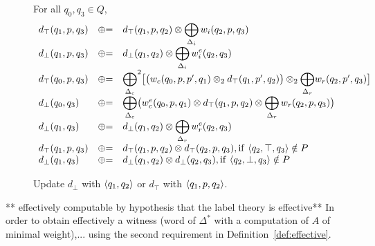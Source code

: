 \begin{figure}[ht]
For all $q_0, q_3 \in Q$, %
\[
\begin{array}{lcl}
d_\top(q_1, p, q_3) & \opluseq &
  d_\top(q_1, p, q_2) \otimes
  \displaystyle\bigoplus_{\Deltai} \weii(q_2, p, q_3)\\
%
d_\bot(q_1, p, q_3) & \opluseq &
  d_\bot(q_1, q_2) \otimes
  \displaystyle\bigoplus_{\Deltai} \weiei(q_2, q_3)\\
%
d_\top(q_0, p, q_3) & \opluseq &
  {\displaystyle\bigoplus_{\Deltac}}^2
  \bigl[ \bigl( \weic(q_0, p, p', q_1) \otimes_2
  d_\top(q_1, p', q_2) \bigr) \otimes_2
  {\displaystyle\bigoplus_{\Deltar}} \weir(q_2, p', q_3) \bigr]\\
%
d_\bot(q_0, q_3) & \opluseq &
  {\displaystyle\bigoplus_{\Deltac}}
  \bigl(
  \weiec(q_0, p, q_1) \otimes
   d_\top(q_1, p, q_2) \otimes
  \displaystyle\bigoplus_{\Deltar} \weir(q_2, p, q_3)\bigr)\\
%
d_\bot(q_1, q_3) & \opluseq &
  d_\bot(q_1, q_2) \otimes
  \displaystyle\bigoplus_{\Deltar} \weier(q_2, q_3)\\
%
d_\top(q_1, p, q_3) & \opluseq &
  d_\top(q_1, p, q_2) \otimes d_\top(q_2, p, q_3),
  \mathrm{if~} \< q_2, \top, q_3> \notin P \\
%
d_\bot(q_1, q_3) & \opluseq &
  d_\bot(q_1, q_2) \otimes d_\bot(q_2, q_3), \mathrm{if~} \< q_2, \bot, q_3> \notin P \\
\end{array}
\]
%
\caption{Update $d_\bot$ with $\<q_1, q_2>$ or $d_\top$ with $\< q_1, p, q_2>$.}
\label{fig:best-update}
\end{figure}


\noindent
** effectively computable by hypothesis that the label theory is effective**
In order to obtain effectively a witness
(word of $\Delta^*$ with a computation of $A$ of minimal weight),...
using the second requirement in Definition~\ref{def:effective}.




